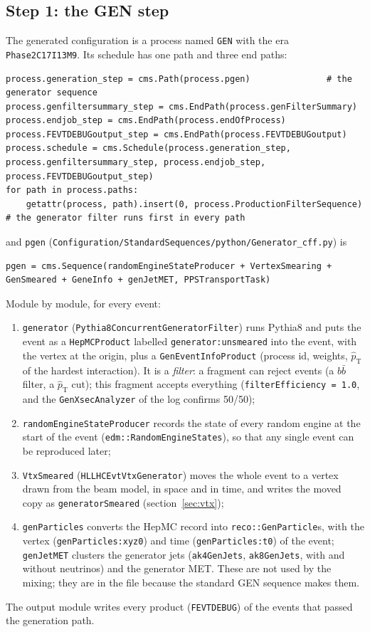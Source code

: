 \documentclass[11pt,a4paper]{article}
\newcommand{\code}[1]{\texttt{#1}}
\newcommand{\bbbar}{\ensuremath{b\bar{b}}}
\newcommand{\ptHat}{\ensuremath{\hat{p}_{\mathrm{T}}}}
\begin{document}
\subsection{Step 1: the GEN step}
\label{sec:genstep}

The generated configuration is a process named \code{GEN} with the era \code{Phase2C17I13M9}. Its schedule
has one path and three end paths:
\begin{lstlisting}[style=py]
process.generation_step = cms.Path(process.pgen)               # the generator sequence
process.genfiltersummary_step = cms.EndPath(process.genFilterSummary)
process.endjob_step = cms.EndPath(process.endOfProcess)
process.FEVTDEBUGoutput_step = cms.EndPath(process.FEVTDEBUGoutput)
process.schedule = cms.Schedule(process.generation_step, process.genfiltersummary_step, process.endjob_step, process.FEVTDEBUGoutput_step)
for path in process.paths:
    getattr(process, path).insert(0, process.ProductionFilterSequence)   # the generator filter runs first in every path
\end{lstlisting}
and \code{pgen} (\code{Configuration/StandardSequences/python/Generator\_cff.py}) is
\begin{lstlisting}[style=py]
pgen = cms.Sequence(randomEngineStateProducer + VertexSmearing + GenSmeared + GeneInfo + genJetMET, PPSTransportTask)
\end{lstlisting}
Module by module, for every event:
\begin{enumerate}
\item \code{generator} (\code{Pythia8ConcurrentGeneratorFilter}) runs Pythia8 and puts the event as a
  \code{HepMCProduct} labelled \code{generator:unsmeared} into the event, with the vertex at the origin, plus a
  \code{GenEventInfoProduct} (process id, weights, $\hat{p}_{\mathrm{T}}$ of the hardest interaction). It is a
  \emph{filter}: a fragment can reject events (a \bbbar{} filter, a $\ptHat$ cut); this fragment accepts
  everything (\code{filterEfficiency = 1.0}, and the \code{GenXsecAnalyzer} of the log confirms 50/50);
\item \code{randomEngineStateProducer} records the state of every random engine at the start of the event
  (\code{edm::RandomEngineStates}), so that any single event can be reproduced later;
\item \code{VtxSmeared} (\code{HLLHCEvtVtxGenerator}) moves the whole event to a vertex drawn from the beam
  model, in space and in time, and writes the moved copy as \code{generatorSmeared} (section~\ref{sec:vtx});
\item \code{genParticles} converts the HepMC record into \code{reco::GenParticle}s, with the vertex
  (\code{genParticles:xyz0}) and time (\code{genParticles:t0}) of the event; \code{genJetMET} clusters the
  generator jets (\code{ak4GenJets}, \code{ak8GenJets}, with and without neutrinos) and the generator MET.
  These are not used by the mixing; they are in the file because the standard GEN sequence makes them.
\end{enumerate}
The output module writes every product (\code{FEVTDEBUG}) of the events that passed the generation path.
\end{document}
